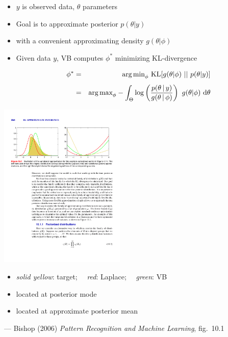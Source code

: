 \documentclass[10pt]{report}
\begin{document}
\begin{itemize}
\item $y$ is observed data, $\theta$ parameters
\item Goal is to approximate posterior $p(\theta | y)$
\item with a convenient approximating density $g(\theta | \phi)$
\item Given data $y$, VB computes $\phi^*$ 
minimizing KL-divergence
\begin{eqnarray*}
\phi^* 
& = & 
\displaystyle
\mbox{arg\,min}_\phi \ \mbox{KL}[g(\theta|\phi) \ || \ p(\theta|y)]
\\[4pt]
& = & 
\displaystyle
\mbox{arg\,max}_\phi 
-\int_{\Theta} 
  \log\left(
    \frac{p(\theta \, | \, y)}{g(\theta \, | \, \phi)}
  \right)
  \ g(\theta | \phi) \ \mathrm{d}\theta
\end{eqnarray*}
\end{itemize}

\vspace*{-6pt}
\begin{center}
\includegraphics[width=0.45\textwidth]{img/bishop-fig-10-1.pdf}
\end{center}
\vspace*{-10pt}
\begin{itemize}
\item {\slshape solid yellow}: target; \ \ {\slshape red}: Laplace; \ \
  {\slshape green}: VB
\item {} located at posterior mode
\item {} located at approximate posterior mean
\end{itemize}
\vfill \hfill
{\footnotesize  --- Bishop (2006) {\slshape Pattern Recognition and Machine Learning}, fig.~10.1}
\end{document}
